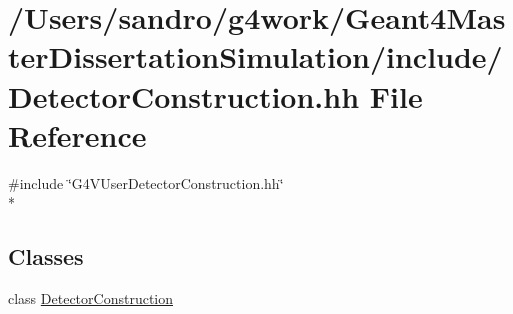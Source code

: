 \hypertarget{_detector_construction_8hh}{\section{/\-Users/sandro/g4work/\-Geant4\-Master\-Dissertation\-Simulation/include/\-Detector\-Construction.hh File Reference}
\label{_detector_construction_8hh}
}
{\ttfamily \#include \char`\"{}G4\-V\-User\-Detector\-Construction.\-hh\char`\"{}}\\*
\subsection*{Classes}
\begin{DoxyCompactItemize}
\item 
class \hyperlink{class_detector_construction}{Detector\-Construction}
\end{DoxyCompactItemize}
